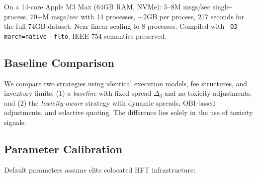 \documentclass[11pt]{article}
\theoremstyle{definition}
\begin{document}
On a 14-core Apple M3 Max (64GB RAM, NVMe): 5--8M msgs/sec single-process, 70+M msgs/sec with 14 processes, $\sim$2GB per process, 217 seconds for the full 74GB dataset. Near-linear scaling to 8 processes. Compiled with \texttt{-O3 -march=native -flto}, IEEE 754 semantics preserved.

\subsection{Baseline Comparison}

We compare two strategies using identical execution models, fee structures, and inventory limits: (1) a \emph{baseline} with fixed spread $\Delta_0$ and no toxicity adjustments, and (2) the \emph{toxicity-aware} strategy with dynamic spreads, OBI-based adjustments, and selective quoting. The difference lies solely in the use of toxicity signals.

\subsection{Parameter Calibration}

Default parameters assume elite colocated HFT infrastructure:
\end{document}
